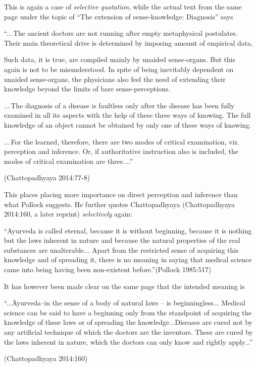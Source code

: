 This is again a case of {\sl selective quotation}, while the actual text from the same page under the topic of ``The extension of sense-knowledge: Diagnosis'' says 
\begin{myquote}
``...\,The ancient doctors are not running after empty metaphysical postulates. Their main theoretical drive is determined by imposing amount of empirical data. 

Such data, it is true, are compiled mainly by unaided sense-organs. But this again is not to be misunderstood. In spite of being inevitably dependent on unaided sense-organs, the physicians also feel the need of extending their knowledge beyond the limits of bare sense-perceptions.

...\,The diagnosis of a disease is faultless only after the disease has been fully examined in all its aspects with the help of these three ways of knowing. The full knowledge of an object cannot be obtained by only one of these ways of knowing.

...\,For the learned, therefore, there are two modes of critical examination, viz. perception and inference. Or, if authoritative instruction also is included, the modes of critical examination are three....'' 

\hfill (Chattopadhyaya 2014:77-8)
\end{myquote}
This places placing more importance on direct perception and inference than what Pollock suggests. He further quotes Chattopadhyaya (Chattopadhyaya 2014:160, a later reprint) {\sl selectively} again: 
\begin{myquote}
``Ayurveda is called eternal, because it is without beginning, because it is nothing but the laws inherent in nature and because the natural properties of the real substances are unalterable... Apart from the restricted sense of acquiring this knowledge and of spreading it, there is no meaning in saying that medical science came into being having been non-existent before.''\hfill (Pollock 1985:517)
\end{myquote}
It has however been made clear on the same page that the intended meaning is

\begin{myquote}
``...Āyurveda--in the sense of a body of natural laws -- is beginningless... Medical science can be said to have a beginning only from the standpoint of acquiring the knowledge of these laws or of spreading the knowledge...Diseases are cured not by any artiﬁcial technique of which the doctors are the inventors. These are cured by the laws inherent in nature, which the doctors can only know and rightly apply...'' 

\hfill (Chattopadhyaya 2014:160)
\end{myquote}

